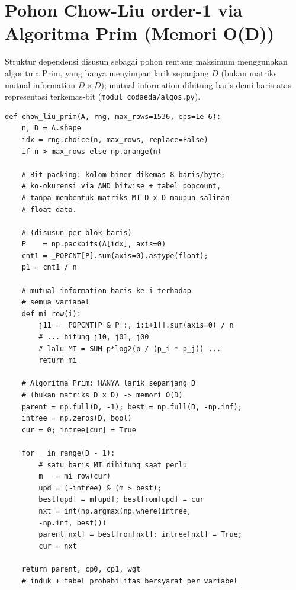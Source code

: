 \section{Pohon Chow-Liu order-1 via Algoritma Prim (Memori O(D))}

Struktur dependensi disusun sebagai pohon rentang maksimum menggunakan algoritma Prim, yang hanya menyimpan larik sepanjang $D$ (bukan matriks mutual information $D \times D$); mutual information dihitung baris-demi-baris atas representasi terkemas-bit (\texttt{modul codaeda/algos.py}).

\begin{verbatim}
def chow_liu_prim(A, rng, max_rows=1536, eps=1e-6):
    n, D = A.shape
    idx = rng.choice(n, max_rows, replace=False) 
    if n > max_rows else np.arange(n)

    # Bit-packing: kolom biner dikemas 8 baris/byte; 
    # ko-okurensi via AND bitwise + tabel popcount, 
    # tanpa membentuk matriks MI D x D maupun salinan 
    # float data.

    # (disusun per blok baris)
    P    = np.packbits(A[idx], axis=0) 
    cnt1 = _POPCNT[P].sum(axis=0).astype(float); 
    p1 = cnt1 / n

    # mutual information baris-ke-i terhadap 
    # semua variabel
    def mi_row(i):            
        j11 = _POPCNT[P & P[:, i:i+1]].sum(axis=0) / n
        # ... hitung j10, j01, j00 
        # lalu MI = SUM p*log2(p / (p_i * p_j)) ...
        return mi

    # Algoritma Prim: HANYA larik sepanjang D 
    # (bukan matriks D x D) -> memori O(D)
    parent = np.full(D, -1); best = np.full(D, -np.inf); 
    intree = np.zeros(D, bool)
    cur = 0; intree[cur] = True

    for _ in range(D - 1):
        # satu baris MI dihitung saat perlu
        m   = mi_row(cur)                       
        upd = (~intree) & (m > best); 
        best[upd] = m[upd]; bestfrom[upd] = cur
        nxt = int(np.argmax(np.where(intree, 
        -np.inf, best)))
        parent[nxt] = bestfrom[nxt]; intree[nxt] = True; 
        cur = nxt

    return parent, cp0, cp1, wgt   
    # induk + tabel probabilitas bersyarat per variabel
\end{verbatim}